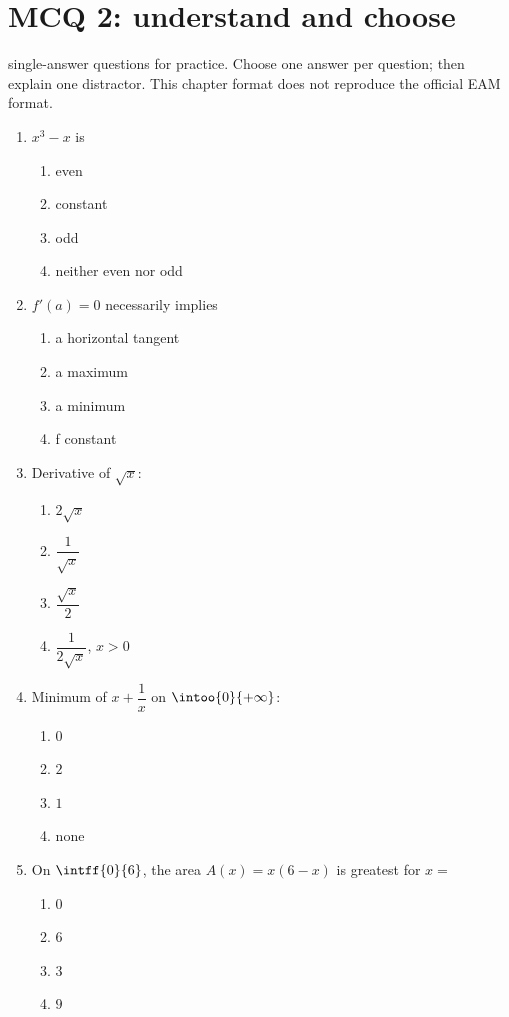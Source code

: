 \endgroup
\begingroup\small
{}\section*{MCQ 2: understand and choose}\label{C06-Q2}
 single-answer questions for practice. Choose one answer per question; then explain one distractor. This chapter format does not reproduce the official EAM format.
\begin{enumerate}
\item $x^3-x$ is
\begin{enumerate}[label=\Alph*.,itemsep=2pt]
\item even
\item constant
\item odd
\item neither even nor odd
\end{enumerate}
\item $f\prime(a)=0$ necessarily implies
\begin{enumerate}[label=\Alph*.,itemsep=2pt]
\item a horizontal tangent
\item a maximum
\item a minimum
\item f constant
\end{enumerate}
\item Derivative of $\sqrt x$:
\begin{enumerate}[label=\Alph*.,itemsep=2pt]
\item $2\sqrt x$
\item $\dfrac{1}{\sqrt x}$
\item $\dfrac{\sqrt x}{2}$
\item $\dfrac{1}{2\sqrt x}$, $x>0$
\end{enumerate}
\item Minimum of $x+\dfrac{1}{x}$ on $\intoo{0}{+\infty}$:
\begin{enumerate}[label=\Alph*.,itemsep=2pt]
\item $0$
\item $2$
\item $1$
\item none
\end{enumerate}
\item On $\intff{0}{6}$, the area $A(x)=x(6-x)$ is greatest for $x=$
\begin{enumerate}[label=\Alph*.,itemsep=2pt]
\item $0$
\item $6$
\item $3$
\item $9$
\end{enumerate}
\end{enumerate}
